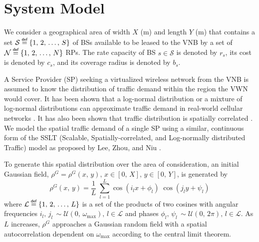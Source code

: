 \documentclass[conference]{IEEEtran}
\newcommand\myeq{\mathrel{\overset{\makebox[0pt]{\mbox{\normalfont\tiny\sffamily def}}}{=}}}
\begin{document}


\section{System Model} \label{sec:model}
We consider a geographical area of width $X$ (m) and length $Y$ (m) that contains a set $\mathcal{S} \myeq \left\{1,\, 2,\, \ldots,\, S\right\}$ of BSs available to be leased to the VNB by a set of $\mathcal{N} \myeq \left\{1,\, 2,\, \ldots,\, N\right\}$ RPs.  The rate capacity of BS $s \in \mathcal{S}$ is denoted by $r_s$, its cost is denoted by $c_s$, and its coverage radius is denoted by $b_s$.

A Service Provider (SP) seeking a virtualized wireless network from the VNB is assumed to know the distribution of traffic demand within the region the VWN would cover.  It has been shown that a log-normal distribution or a mixture of log-normal distributions can approximate traffic demand in real-world cellular networks \cite{686105, 5936263}.  It has also been shown that traffic distribution is spatially correlated \cite{5936263, eigenplaces}.  We model the spatial traffic demand of a single SP using a similar, continuous form of the SSLT (Scalable, Spatially-correlated, and Log-normally distributed Traffic) model as proposed by Lee, Zhou, and Niu \cite{6554749}.

To generate this spatial distribution over the area of consideration, an initial Gaussian field, $\rho^G = \rho^G\left(x,\, y\right),\, x \in \left[0,\, X\right],\, y \in \left[0,\, Y\right]$, is generated by
\begin{equation}
\rho^G\left(x,\, y\right)=\frac{1}{L} \; \sum_{l=1}^L \cos\left(i_lx+\phi_l\right) \; \cos\left(j_ly+\psi_l\right)
\end{equation} \label{eq:rhoG}
\noindent where $\mathcal{L} \myeq \left\{1,\, 2,\, \ldots,\, L\right\}$ is a set of the products of two cosines with angular frequencies $i_l,\, j_l\, \sim \mathcal{U}\left(0,\, \omega_{\max}\right),\, l \in \mathcal{L}$ and phases $\phi_l,\, \psi_l\, \sim \mathcal{U}\left(0,\, 2\pi\right),\, l \in \mathcal{L}$.  As $L$ increases, $\rho^G$ approaches a Gaussian random field with a spatial autocorrelation dependent on $\omega_{\max}$ according to the central limit theorem.
\end{document}
